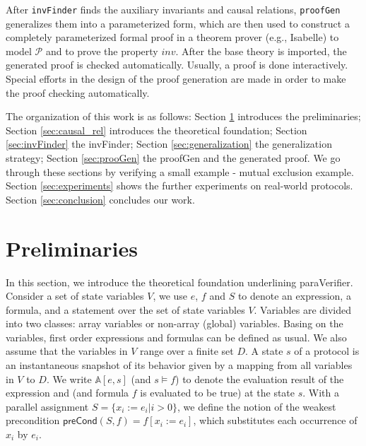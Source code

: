 \documentclass[final]{IEEEtran}
\begin{document}
After {\tt invFinder} finds the auxiliary invariants and causal relations, {\tt proofGen} generalizes them  into a parameterized form, which are then used to construct a completely parameterized formal proof in a theorem prover (e.g., Isabelle) to model $\mathcal{P}$ and to prove the property $inv$. After the base theory is imported, the generated proof is checked automatically.  Usually, a proof is done interactively. Special efforts in the design of the proof generation are made in order to make the proof checking automatically. %

The organization of this work is as follows: Section \ref{sec:Preliminaries} introduces the preliminaries; Section  \ref{sec:causal_rel} introduces the theoretical foundation; Section \ref{sec:invFinder} the {\sf invFinder}; Section \ref{sec:generalization} the generalization strategy; Section \ref{sec:prooGen} the {\sf proofGen} and the generated proof. We go through these sections by verifying a small example - mutual exclusion example. Section \ref{sec:experiments} shows the further experiments on real-world protocols. Section \ref{sec:conclusion} concludes our work.

\section{Preliminaries}\label{sec:Preliminaries}
In this section, we introduce the theoretical foundation underlining
{\sf paraVerifier}. Consider a set of state variables $V$,
we use $e$, $f$ and $S$ to denote an
expression, a formula, and a statement over the set of state
variables $V$.
Variables are divided into two classes: array variables or
non-array (global) variables. Basing on the variables, first order expressions and formulas can be defined as usual. We also assume that the variables in $V$ range over a finite set $D$.
A state $s$  of a protocol is an
instantaneous snapshot of its behavior given by a mapping from
all variables in $V$ to $D$.  We write
$\mathbb{A}[e,s]$ (and $s \models f$) to denote the
evaluation result of the expression and (and formula $f$ is  evaluated to be true) at the state $s$.
With a parallel assignment $S=\{x_i:=e_i | i>0\}$,
we define the notion of the weakest precondition $\mathsf{preCond}(S,f)=f[x_i:=e_i]$, which substitutes each
occurrence of $x_i$ by $e_i$.
\end{document}
